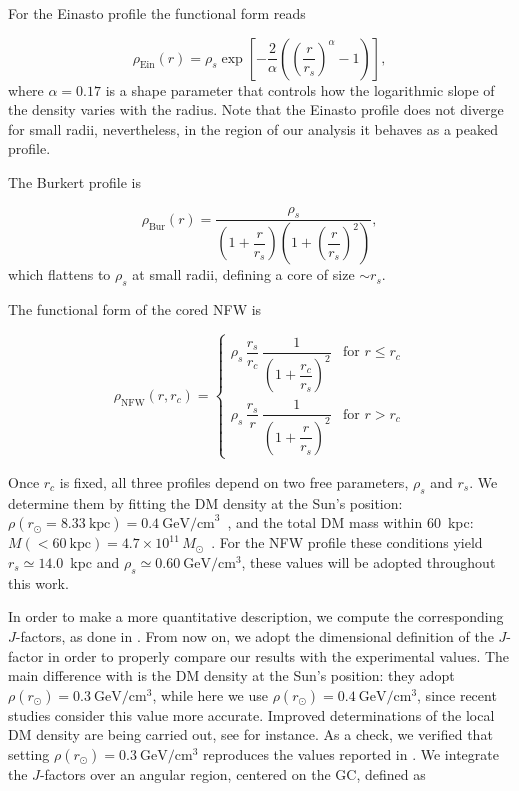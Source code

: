 For the Einasto profile the functional form reads

\begin{equation}
\label{eq:rho_einasto}
\rho_{\mathrm{Ein}}(r)
=
\rho_s \exp\!\left[
-\frac{2}{\alpha}\left(\left(\frac{r}{r_s}\right)^{\alpha}-1\right)
\right],
\end{equation}
where $\alpha = 0.17$ is a shape parameter that controls how the logarithmic slope of the density varies with the radius. Note that the Einasto profile does not diverge for small radii, 
nevertheless, in the region of our analysis it behaves as a peaked profile.

The Burkert profile is

\begin{equation}
\label{eq:rho_burkert}
\rho_{\mathrm{Bur}}(r)
=
\frac{\rho_s}{\left(1+\dfrac{r}{r_s}\right)\left(1+\left(\dfrac{r}{r_s}\right)^2\right)},
\end{equation}
which flattens to $\rho_s$ at small radii, defining a core of size $\sim r_s$.
 

The functional form of the cored NFW is


\begin{equation}
\label{eq:rho_nfw_cored}
\rho_{\mathrm{NFW}}(r,r_c)=
\begin{cases}
\rho_s\,\dfrac{r_s}{r_c}\,\dfrac{1}{\left(1+\dfrac{r_c}{r_s}\right)^2}
& \text{for } r \le r_c \\[10pt]
\rho_s\,\dfrac{r_s}{r}\,\dfrac{1}{\left(1+\dfrac{r}{r_s}\right)^2}
& \text{for } r > r_c
\end{cases}
\end{equation}

Once $r_c$ is fixed, all three profiles depend on two free parameters, $\rho_s$ and $r_s$.
We determine them by fitting the DM density at the Sun's position: $\rho(r_\odot = 8.33~\text{kpc}) = 0.4~\text{GeV/cm}^3$~\cite{Read_2014}, and the total DM mass within 60~kpc: $M(<60~\text{kpc}) = 4.7 \times 10^{11}\,M_\odot$~\cite{Lefranc_2016}.
For the NFW profile these conditions yield $r_s \simeq 14.0$~kpc and
$\rho_s \simeq 0.60~\mathrm{GeV/cm^3}$, these values will be adopted throughout this work.

In order to make a more quantitative description, we compute the corresponding $J$-factors, as done in \cite{Lefranc_2016}. 
From now on, we adopt the dimensional definition of the $J$-factor in order to properly compare our results with the experimental values.
The main difference with \cite{Lefranc_2016} is the DM density at the Sun's position: they adopt \(\rho(r_\odot)=0.3~\mathrm{GeV/cm^3}\), while here we use \(\rho(r_\odot)=0.4~\mathrm{GeV/cm^3}\), since recent studies consider this value more accurate. Improved determinations of the local DM density are being carried out, see \cite{Read_2014} for instance.
As a check, we verified that setting \(\rho(r_\odot)=0.3~\mathrm{GeV/cm^3}\) reproduces the values reported in \cite{Lefranc_2016}.
We integrate the $J$-factors over an angular region, centered on the GC, defined as 

